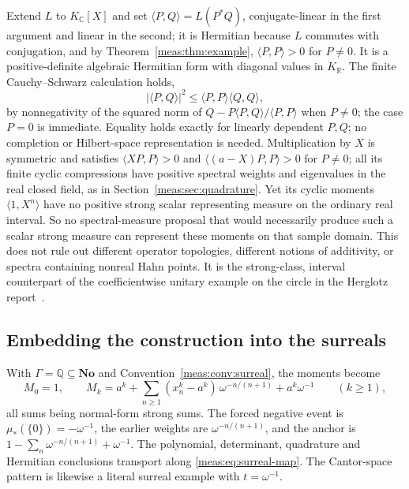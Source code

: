 \documentclass[11pt]{article}
\numberwithin{equation}{section}
\theoremstyle{definition}
\theoremstyle{remark}
\newcommand{\R}{\mathbb R}
\newcommand{\C}{\mathbb C}
\newcommand{\Q}{\mathbb Q}
\newcommand{\No}{\mathbf{No}}
\newcommand{\KR}{K_{\R}}
\newcommand{\KC}{K_{\C}}
\newcommand{\abs}[1]{\lvert#1\rvert}
\newcommand{\inner}[2]{\langle#1,#2\rangle}
\begin{document}
Extend $L$ to $\KC[X]$ and set $\inner PQ=L(P^*Q)$, conjugate-linear in the first
argument and linear in the second; it is Hermitian because $L$ commutes with
conjugation, and by Theorem~\ref{meas:thm:example}, $\inner PP>0$ for $P\ne0$. It is
a positive-definite algebraic Hermitian form with diagonal values in $\KR$. The
finite Cauchy--Schwarz calculation holds,
\begin{equation}\label{meas:eq:CS}
 \abs{\inner PQ}^2\le\inner PP\inner QQ,
\end{equation}
by nonnegativity of the squared norm of $Q-P\inner PQ/\inner PP$ when
$P\ne0$; the case $P=0$ is immediate. Equality holds exactly for linearly
dependent $P,Q$; no completion or Hilbert-space
representation is needed. Multiplication by $X$ is symmetric and satisfies
$\inner{XP}P>0$ and $\inner{(a-X)P}P>0$ for $P\ne0$; all its finite cyclic
compressions have positive spectral weights and eigenvalues in the real closed
field, as in Section~\ref{meas:sec:quadrature}. Yet its cyclic moments
$\inner1{X^n}$ have no positive strong scalar representing measure on the
ordinary real interval. So no spectral-measure proposal that would necessarily
produce such a scalar strong measure can represent these moments on that
sample domain. This does not rule out different operator topologies, different
notions of additivity, or spectra containing nonreal Hahn points. It is the
strong-class, interval counterpart of the coefficientwise unitary example on the
circle in the Herglotz report~\cite{repoherg}.

\subsection{Embedding the construction into the surreals}

With $\Gamma=\Q\subseteq\No$ and Convention~\ref{meas:conv:surreal}, the moments
become
\begin{equation}\label{meas:eq:surrealmoments}
 M_0=1,\qquad
 M_k=a^k+\sum_{n\ge1}(x_n^k-a^k)\,\omega^{-n/(n+1)}+a^k\omega^{-1}\qquad(k\ge1),
\end{equation}
all sums being normal-form strong sums. The forced negative event is
$\mu_*(\{0\})=-\omega^{-1}$, the earlier weights are $\omega^{-n/(n+1)}$, and the
anchor is $1-\sum_n\omega^{-n/(n+1)}+\omega^{-1}$. The polynomial, determinant,
quadrature and Hermitian conclusions transport along
\eqref{meas:eq:surreal-map}. The Cantor-space pattern is likewise a literal
surreal example with $t=\omega^{-1}$.
\end{document}
